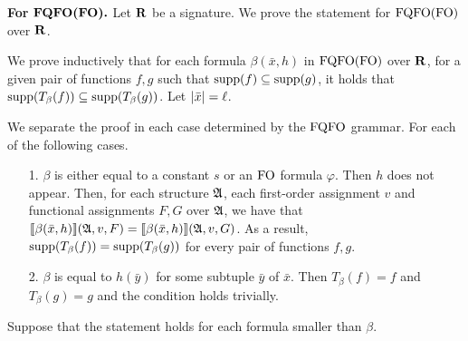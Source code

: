 {\bf For }$\boldsymbol{{\rm FQFO}({\rm FO}).}$ Let $\mathbf{R}$ be a signature. We prove the statement for ${\rm FQFO}({\rm FO})$ over $\mathbf{R}$.

We prove inductively that for each formula $\beta(\bar{x},h)$ in ${\rm FQFO}({\rm FO})$ over $\mathbf{R}$, for a given pair of functions $f,g$ such that $\text{\rm supp}(f)\subseteq\text{\rm supp}(g)$, it holds that $\text{\rm supp}(T_{\beta}(f))\subseteq\text{\rm supp}(T_{\beta}(g))$. Let $\vert \bar{x} \vert = \ell$.

We separate the proof in each case determined by the ${\rm FQFO}$ grammar. For each of the following cases.
\begin{itemize}
\item[1.] $\beta$ is either equal to a constant $s$ or an ${\rm FO}$ formula $\varphi$. Then $h$ does not appear. Then, for each structure $\mathfrak{A}$, each first-order assignment $v$ and functional assignments $F,G$ over $\mathfrak{A}$, we have that ${\llbracket{}{\beta(\bar{x},h)}\rrbracket}(\mathfrak{A},v,F) = {\llbracket{}{\beta(\bar{x},h)}\rrbracket}(\mathfrak{A},v,G)$. As a result, $\text{\rm supp}(T_{\beta}(f)) = \text{\rm supp}(T_{\beta}(g))$ for every pair of functions $f,g$.
\item[2.] $\beta$ is equal to $h(\bar{y})$ for some subtuple $\bar{y}$ of $\bar{x}$. Then $T_{\beta}(f) = f$ and $T_{\beta}(g) = g$ and the condition holds trivially.
\end{itemize}
Suppose that the statement holds for each formula smaller than $\beta$.
